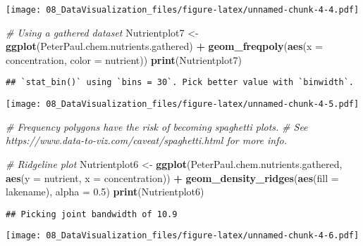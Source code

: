 \documentclass[
]{article}
\newenvironment{Shaded}{\begin{snugshade}}{\end{snugshade}}
\newcommand{\CommentTok}[1]{\textcolor[rgb]{0.56,0.35,0.01}{\textit{#1}}}
\newcommand{\DataTypeTok}[1]{\textcolor[rgb]{0.13,0.29,0.53}{#1}}
\newcommand{\FloatTok}[1]{\textcolor[rgb]{0.00,0.00,0.81}{#1}}
\newcommand{\KeywordTok}[1]{\textcolor[rgb]{0.13,0.29,0.53}{\textbf{#1}}}
\newcommand{\NormalTok}[1]{#1}
\newcommand{\OperatorTok}[1]{\textcolor[rgb]{0.81,0.36,0.00}{\textbf{#1}}}
\newcommand{\StringTok}[1]{\textcolor[rgb]{0.31,0.60,0.02}{#1}}
\begin{document}
\texttt{[image: 08\_DataVisualization\_files/figure-latex/unnamed-chunk-4-4.pdf]}

\begin{Shaded}
\begin{Highlighting}[]
\CommentTok{# Using a gathered dataset}
\NormalTok{Nutrientplot7 <-}\StringTok{   }
\StringTok{  }\KeywordTok{ggplot}\NormalTok{(PeterPaul.chem.nutrients.gathered) }\OperatorTok{+}
\StringTok{  }\KeywordTok{geom_freqpoly}\NormalTok{(}\KeywordTok{aes}\NormalTok{(}\DataTypeTok{x =}\NormalTok{ concentration, }\DataTypeTok{color =}\NormalTok{ nutrient))}
\KeywordTok{print}\NormalTok{(Nutrientplot7)}
\end{Highlighting}
\end{Shaded}

\begin{verbatim}
## `stat_bin()` using `bins = 30`. Pick better value with `binwidth`.
\end{verbatim}

\texttt{[image: 08\_DataVisualization\_files/figure-latex/unnamed-chunk-4-5.pdf]}

\begin{Shaded}
\begin{Highlighting}[]
\CommentTok{# Frequency polygons have the risk of becoming spaghetti plots. }
\CommentTok{# See https://www.data-to-viz.com/caveat/spaghetti.html for more info.}

\CommentTok{# Ridgeline plot}
\NormalTok{Nutrientplot6 <-}
\StringTok{  }\KeywordTok{ggplot}\NormalTok{(PeterPaul.chem.nutrients.gathered, }\KeywordTok{aes}\NormalTok{(}\DataTypeTok{y =}\NormalTok{ nutrient, }\DataTypeTok{x =}\NormalTok{ concentration)) }\OperatorTok{+}
\StringTok{  }\KeywordTok{geom_density_ridges}\NormalTok{(}\KeywordTok{aes}\NormalTok{(}\DataTypeTok{fill =}\NormalTok{ lakename), }\DataTypeTok{alpha =} \FloatTok{0.5}\NormalTok{) }
\KeywordTok{print}\NormalTok{(Nutrientplot6)}
\end{Highlighting}
\end{Shaded}

\begin{verbatim}
## Picking joint bandwidth of 10.9
\end{verbatim}

\texttt{[image: 08\_DataVisualization\_files/figure-latex/unnamed-chunk-4-6.pdf]}

\begin{Shaded}
\end{Shaded}
\end{document}
